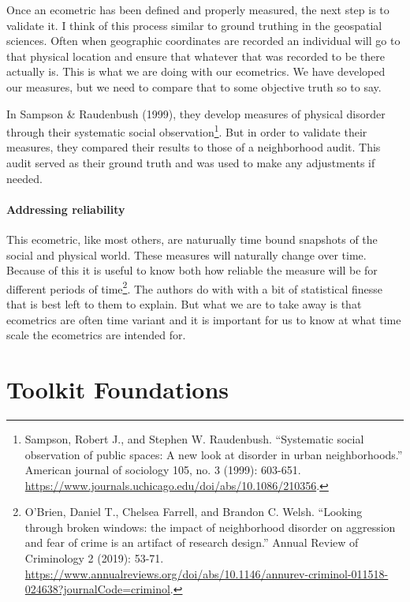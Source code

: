 \documentclass[
]{book}
\begin{document}
Once an ecometric has been defined and properly measured, the next step is to validate it. I think of this process similar to ground truthing in the geospatial sciences. Often when geographic coordinates are recorded an individual will go to that physical location and ensure that whatever that was recorded to be there actually is. This is what we are doing with our ecometrics. We have developed our measures, but we need to compare that to some objective truth so to say.

In Sampson \& Raudenbush (1999), they develop measures of physical disorder through their systematic social observation\footnote{Sampson, Robert J., and Stephen W. Raudenbush. ``Systematic social observation of public spaces: A new look at disorder in urban neighborhoods.'' American journal of sociology 105, no. 3 (1999): 603-651. \url{https://www.journals.uchicago.edu/doi/abs/10.1086/210356}.}. But in order to validate their measures, they compared their results to those of a neighborhood audit. This audit served as their ground truth and was used to make any adjustments if needed.

\hypertarget{addressing-reliability}{%
\subsection{Addressing reliability}\label{addressing-reliability}}

This ecometric, like most others, are naturually time bound snapshots of the social and physical world. These measures will naturally change over time. Because of this it is useful to know both how reliable the measure will be for different periods of time\footnote{O'Brien, Daniel T., Chelsea Farrell, and Brandon C. Welsh. ``Looking through broken windows: the impact of neighborhood disorder on aggression and fear of crime is an artifact of research design.'' Annual Review of Criminology 2 (2019): 53-71. \url{https://www.annualreviews.org/doi/abs/10.1146/annurev-criminol-011518-024638?journalCode=criminol}.}. The authors do with with a bit of statistical finesse that is best left to them to explain. But what we are to take away is that ecometrics are often time variant and it is important for us to know at what time scale the ecometrics are intended for.

\hypertarget{part-toolkit-foundations}{%
\part{Toolkit Foundations}\label{part-toolkit-foundations}}
\end{document}
